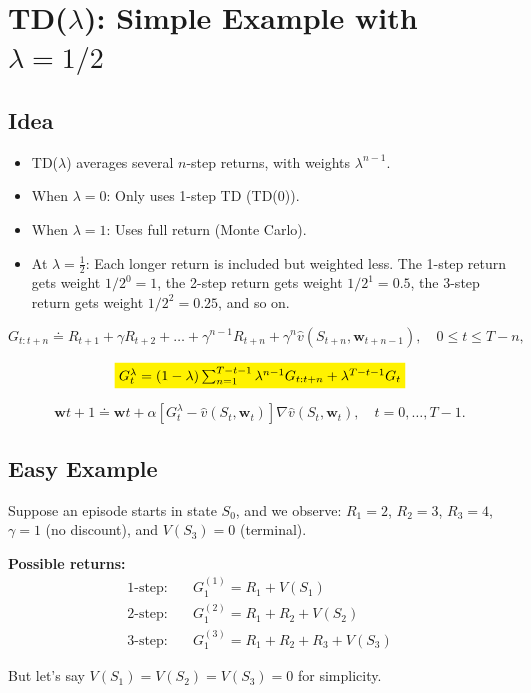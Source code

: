 \documentclass[12pt]{article}
\begin{document}
\section{TD($\lambda$): Simple Example with $\lambda=1/2$}

\subsection{Idea}
\begin{itemize}
    \item TD($\lambda$) averages several $n$-step returns, with weights $\lambda^{n-1}$.
    \item When $\lambda=0$: Only uses 1-step TD (TD(0)).
    \item When $\lambda=1$: Uses full return (Monte Carlo).
    \item At $\lambda = \frac{1}{2}$: Each longer return is included but weighted less. 
The 1-step return gets weight $1/2^{0} = 1$, the 2-step return gets weight $1/2^{1} = 0.5$, 
the 3-step return gets weight $1/2^{2} = 0.25$, and so on.

\end{itemize}

$$
G_{t:t+n} \doteq R_{t+1} + \gamma R_{t+2} + \dots + \gamma^{n-1}R_{t+n} + \gamma^{n}\hat{v}(S_{t+n}, \mathbf{w}_{t+n-1}), \quad 0 \leq t \leq T-n,
$$

\[
\colorbox{yellow}{$
G_{t}^{\lambda} = (1-\lambda) \sum_{n=1}^{T-t-1} \lambda^{n-1}G_{t:t+n} + \lambda^{T-t-1}G_{t}
$}
\]


$$
\mathbf{w}{t+1} \doteq \mathbf{w}{t} + \alpha \left[G_{t}^{\lambda} - \hat{v}(S_t, \mathbf{w}_t)\right] \nabla\hat{v}(S_t, \mathbf{w}_t), \quad t=0, \dots, T-1.
$$

\subsection{Easy Example}
Suppose an episode starts in state $S_0$, and we observe:  
$R_1=2$, $R_2=3$, $R_3=4$, $\gamma=1$ (no discount), and $V(S_3) = 0$ (terminal).

\textbf{Possible returns:}
\begin{align*}
\text{1-step:}\quad & G_1^{(1)} = R_1 + V(S_1) \\
\text{2-step:}\quad & G_1^{(2)} = R_1 + R_2 + V(S_2) \\
\text{3-step:}\quad & G_1^{(3)} = R_1 + R_2 + R_3 + V(S_3)
\end{align*}

But let's say $V(S_1)=V(S_2)=V(S_3)=0$ for simplicity.
\end{document}
